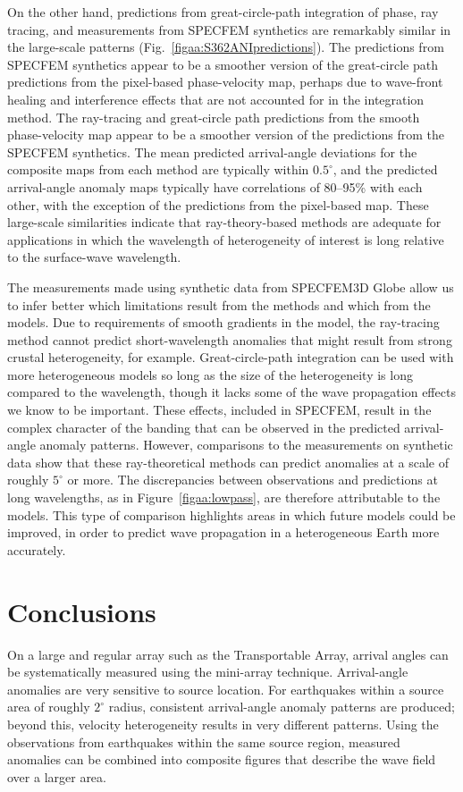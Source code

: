 \documentclass[12pt,oneside]{book}
\newcommand{\degree}[1]{\mbox{$#1^{\circ}$}}
\begin{document}
On the other hand, predictions from great-circle-path integration of phase, ray tracing, and measurements from SPECFEM synthetics are remarkably similar in the large-scale patterns (Fig.~\ref{figaa:S362ANIpredictions}). The predictions from SPECFEM synthetics appear to be a smoother version of the great-circle path predictions from the pixel-based phase-velocity map, perhaps due to wave-front healing and interference effects that are not accounted for in the integration method. The ray-tracing and great-circle path predictions from the smooth phase-velocity map appear to be a smoother version of the predictions from the SPECFEM synthetics. The mean predicted arrival-angle deviations for the composite maps from each method are typically within \degree{0.5}, and the predicted arrival-angle anomaly maps typically have correlations of 80--95\% with each other, with the exception of the predictions from the pixel-based map. These large-scale similarities indicate that ray-theory-based methods are adequate for applications in which the wavelength of heterogeneity of interest is long relative to the surface-wave wavelength. 

The measurements made using synthetic data from SPECFEM3D Globe allow us to infer better which limitations result from the methods and which from the models. Due to requirements of smooth gradients in the model, the ray-tracing method cannot predict short-wavelength anomalies that might result from strong crustal heterogeneity, for example. Great-circle-path integration can be used with more heterogeneous models so long as the size of the heterogeneity is long compared to the wavelength, though it lacks some of the wave propagation effects we know to be important. These effects, included in SPECFEM, result in the complex character of the banding that can be observed in the predicted arrival-angle anomaly patterns. However, comparisons to the measurements on synthetic data show that these ray-theoretical methods can predict anomalies at a scale of roughly \degree{5} or more. The discrepancies between observations and predictions at long wavelengths, as in Figure~\ref{figaa:lowpass}, are therefore attributable to the models. This type of comparison highlights areas in which future models could be improved, in order to predict wave propagation in a heterogeneous Earth more accurately. 

\section{Conclusions}
On a large and regular array such as the Transportable Array, arrival angles can be systematically measured using the mini-array technique. Arrival-angle anomalies are very sensitive to source location. For earthquakes within a source area of roughly \degree{2} radius, consistent arrival-angle anomaly patterns are produced; beyond this, velocity heterogeneity results in very different patterns. Using the observations from earthquakes within the same source region, measured anomalies can be combined into composite figures that describe the wave field over a larger area.
\end{document}
